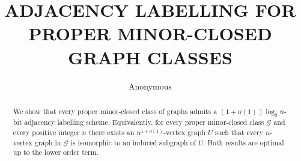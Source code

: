 \documentclass{patmorin}
\title{\MakeUppercase{\boldmath  Adjacency labelling for proper minor-closed graph classes}}
\author{Anonymous}
\date{}
\newcommand{\david}[1]{{\color{orange} DW: #1}}
\newcommand{\vida}[1]{{\color{pink} VD: #1}}
\newcommand{\pat}[1]{\textcolor{Magenta}{PaMo: #1}}
\newcommand{\gwen}[1]{\textcolor{Purple}{GJ: #1}}
\newcommand{\piotr}[1]{\textcolor{red}{PiMi: #1}}
\newcommand{\calG}{\mathcal{G}}
\begin{document}
\maketitle


\begin{abstract}
We show that every proper minor-closed class of graphs admits
a $(1+o(1))\log_2 n$-bit adjacency labelling scheme. Equivalently, for every proper minor-closed class $\calG$ and every positive integer $n$ there exists an $n^{1+o(1)}$-vertex graph $U$ such that every $n$-vertex graph in $\calG$ is isomorphic to an induced subgraph of $U$. 
Both results are optimal up to the lower order term. 
  \end{abstract}

\end{document}
